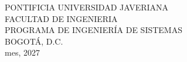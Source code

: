 \begin{center}
        \vspace{0.3cm}
        \LARGE


        \vspace{1cm}

         \large
        PONTIFICIA UNIVERSIDAD JAVERIANA \\
        \vspace{0.5cm}
        FACULTAD DE INGENIERIA \\
        \vspace{0.5cm}
        PROGRAMA DE INGENIERÍA DE SISTEMAS \\
        \vspace{0.5cm}
        BOGOTÁ, D.C. \\
        \vspace{0.3cm}
        mes, 2027
        
    \end{center}